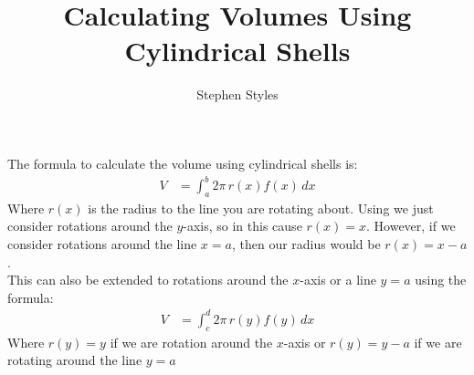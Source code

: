 \documentclass[16pt]{article}
\title{Calculating Volumes Using Cylindrical Shells}
\author{Stephen Styles}
\theoremstyle{remark}
\begin{document}
\maketitle

The formula to calculate the volume using cylindrical shells is:
\begin{align*}
V&= \int_a^b 2\pi\, r(x) f(x) \, dx
\end{align*}
Where $r(x)$ is the radius to the line you are rotating about. Using we just consider rotations around the $y$-axis, so in this cause $r(x)=x$. However, if we consider rotations around the line $x=a$, then our radius would be $r(x)=x-a$.\\

This can also be extended to rotations around the $x$-axis or a line $y=a$ using the formula:
\begin{align*}
V&= \int_c^d 2\pi\, r(y) f(y) \, dx
\end{align*}
Where $r(y)=y$ if we are rotation around the $x$-axis or $r(y) = y-a$ if we are rotating around the line $y=a$\\
\end{document}

